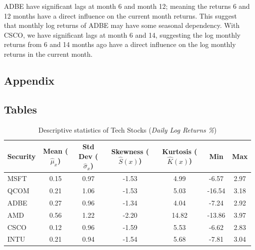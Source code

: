\documentclass[12pt]{article}
\begin{document}
ADBE have significant lags at month 6 and month 12; meaning the returns 6 and 12 months have a direct influence on the current month returns. This suggest that monthly log returns of ADBE may have some seasonal dependency. With CSCO, we have significant lags at month 6 and 14, suggesting the log monthly returns from 6 and 14 months ago have a direct influence on the log monthly returns in the current month.
\newpage
\begin{appendices}
\section{Appendix}
\subsection{Tables}
\begin{table}[ht]
	\centering
	\caption{Descriptive statistics of Tech Stocks (\textit{Daily Log Returns \%})}
	\begin{tabular}[t]{lcccccc}
		\toprule
		Security & Mean ($\hat{\mu}_x$) & Std Dev ($\hat{\sigma}_x$) & Skewness ($\hat{S}(x)$) & Kurtosis ($\hat{K}(x)$) &Min&Max \\
		\midrule
		MSFT & 0.15 & 0.97 &-1.53 & 4.99 &-6.57  &2.97  \\
		QCOM & 0.21 & 1.06 &-1.53 & 5.03 &-16.54 &3.18 \\	
		ADBE & 0.27 & 0.96 &-1.34 & 4.04 &-7.24  &2.92 \\
		AMD  & 0.56 & 1.22 &-2.20 & 14.82 &-13.86 &3.97 \\		
		CSCO & 0.12 & 0.96 &-1.59 & 5.53 &-6.62  &2.83 \\
		INTU & 0.21 & 0.94 &-1.54 & 5.68 &-7.81  &3.04 	\\	   
		\bottomrule
	\end{tabular}\label{tab:log_descriptive}
\end{table}
\end{appendices}
	
\end{document}
